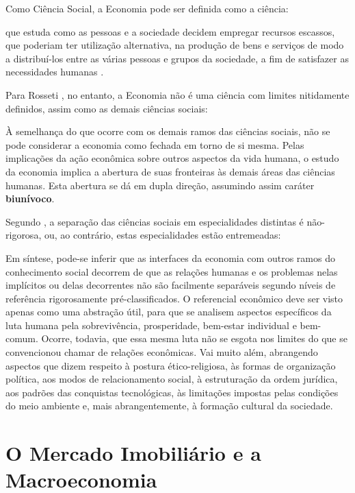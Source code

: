 \documentclass[
	12pt,				%
	oneside,			%
	a4paper,			%
	chapter=TITLE,		%
	section=TITLE,		%
	english,			%
	brazil				%
	]{abntex2}
\begin{document}
Como Ciência Social, a Economia pode ser definida como a ciência:
\begin{citacao}
que estuda como as pessoas e a sociedade decidem empregar recursos escassos, que
poderiam ter utilização alternativa, na produção de bens e serviços de modo a
distribuí-los  entre as várias pessoas e grupos da sociedade, a fim de
satisfazer as necessidades humanas
\cite[p.~5]{passosnogami}.
\end{citacao}
Para Rosseti \autocite*[31]{rossetti}, no entanto, a Economia não é uma
ciência com limites nitidamente definidos, assim como as demais ciências
sociais:
\begin{citacao}
À semelhança do que ocorre com os demais ramos das ciências sociais, não se pode
considerar a economia como fechada em torno de si mesma. Pelas implicações da
ação econômica sobre outros aspectos da vida humana, o estudo da economia
implica a abertura de suas fronteiras às demais áreas das ciências humanas. Esta
abertura se dá em dupla direção, assumindo assim caráter \textbf{biunívoco}.
\end{citacao}
Segundo \autocite*[32]{rossetti}, a separação das ciências sociais em
especialidades distintas é não-rigorosa, ou, ao contrário, estas
especialidades estão entremeadas:
\begin{citacao}
Em síntese, pode-se inferir que as interfaces da economia com outros ramos do
conhecimento social decorrem de que as relações humanas e os problemas nelas
implícitos ou delas decorrentes não são facilmente separáveis segundo níveis de
referência rigorosamente pré-classificados. O referencial econômico deve ser
visto apenas como uma abstração útil, para que se analisem aspectos específicos
da luta humana pela sobrevivência, prosperidade, bem-estar individual e
bem-comum. Ocorre, todavia, que essa mesma luta não se esgota nos limites do que
se convencionou chamar de relações econômicas. Vai muito além, abrangendo
aspectos que dizem respeito à postura ético-religiosa, às formas de organização
política, aos modos de relacionamento social, à estruturação da ordem jurídica,
aos padrões das conquistas tecnológicas, às limitações impostas pelas condições
do meio ambiente e, mais abrangentemente, à formação cultural da sociedade.
\end{citacao}
\section{O Mercado Imobiliário e a Macroeconomia}\label{macro}
\end{document}
